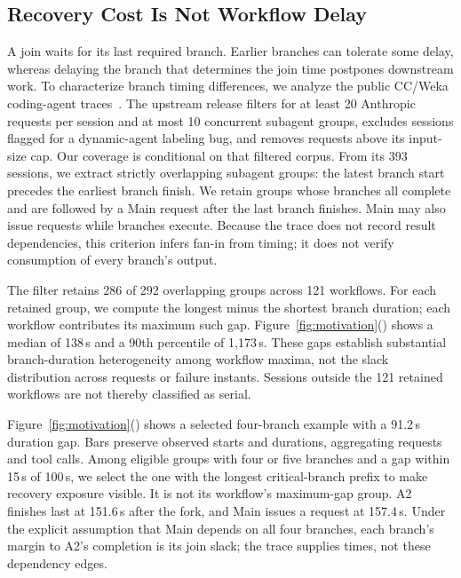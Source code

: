 \subsection{Recovery Cost Is Not Workflow Delay}
\label{sec:motivation-workflow}

A join waits for its last required branch. Earlier branches can tolerate
some delay, whereas delaying the branch that determines the join time
postpones downstream work. To characterize branch timing differences, we
analyze the public CC/Weka coding-agent
traces~\cite{semianalysis2026cctraces}. The upstream release filters for
at least 20 Anthropic requests per session and at most 10 concurrent
subagent groups, excludes sessions flagged for a dynamic-agent labeling
bug, and removes requests above its input-size cap. Our coverage is
conditional on that filtered corpus. From its 393 sessions, we extract
strictly overlapping subagent groups: the latest branch start precedes
the earliest branch finish. We retain groups whose branches all complete
and are followed by a Main request after the last branch finishes.
Main may also issue requests while branches execute. Because the trace
does not record result dependencies, this criterion infers fan-in from
timing; it does not verify consumption of every branch's output.

The filter retains 286 of 292 overlapping groups across 121 workflows.
For each retained group, we compute the longest minus the shortest branch
duration; each workflow contributes its maximum such gap.
Figure~\ref{fig:motivation}() shows a median of
138\,s and a 90th percentile of 1,173\,s. These gaps establish substantial
branch-duration heterogeneity among workflow maxima, not the slack
distribution across requests or failure instants. Sessions outside the
121 retained workflows are not thereby classified as serial.

Figure~\ref{fig:motivation}() shows a
selected four-branch example with a 91.2\,s duration gap. Bars preserve
observed starts and durations, aggregating requests and tool calls.
Among eligible groups with four or five branches and a gap within
15\,s of 100\,s, we select the one with the longest critical-branch prefix
to make recovery exposure visible. It is not its workflow's maximum-gap
group. A2 finishes last at 151.6\,s after the fork, and Main issues a
request at 157.4\,s. Under the explicit assumption that Main depends on
all four branches, each branch's margin to A2's completion is its join
slack; the trace supplies times, not these dependency edges.


